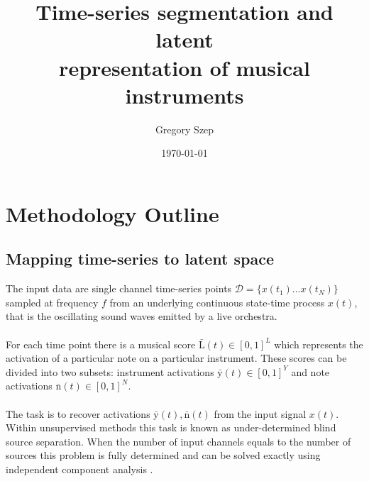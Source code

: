 \documentclass{article}[12pt]
\numberwithin{equation}{section}
\begin{document}
\title{
Time-series segmentation and latent\\ representation of musical instruments
}

\author{Gregory Szep}
\date{\today}
\maketitle
\vspace{-3em}

\section{Methodology Outline}
\subsection{Mapping time-series to latent space}
The input data are single channel time-series points $\mathcal{D}=\{x(t_1)\dots
x(t_N)\}$ sampled at frequency $f$ from an underlying continuous state-time
process $x(t)$, that is the oscillating sound waves emitted by a live orchestra.
\\\\
For each time point there is a musical score $\bar{\mathrm{L}}(t)\in[0,1]^L$ which
represents the activation of a particular note on a particular instrument. These scores
can be divided into two subsets: instrument activations $\bar{\mathrm{y}}(t)\in[0,1]^Y$ and note activations $\bar{\mathrm{n}}(t)\in[0,1]^N$.
\\\\
The task is to recover activations $\bar{\mathrm{y}}(t),\bar{\mathrm{n}}(t)$ from
the input signal $x(t)$. Within unsupervised methods this task is known as
under-determined blind source separation. When the number of input channels
equals to the number of sources this problem is fully determined and can be
solved exactly using independent component analysis \cite{Platt1995Information-MaximizationDeconvolution}.
\end{document}
